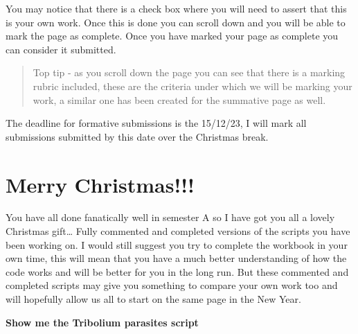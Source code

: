 \documentclass[
]{book}
\begin{document}
You may notice that there is a check box where you will need to assert that this is your own work. Once this is done you can scroll down and you will be able to mark the page as complete. Once you have marked your page as complete you can consider it submitted.

\begin{quote}
Top tip - as you scroll down the page you can see that there is a marking rubric included, these are the criteria under which we will be marking your work, a similar one has been created for the summative page as well.
\end{quote}

The deadline for formative submissions is the 15/12/23, I will mark all submissions submitted by this date over the Christmas break.

\hypertarget{code}{%
\chapter{Merry Christmas!!!}\label{code}}

You have all done fanatically well in semester A so I have got you all a lovely Christmas gift\ldots{} Fully commented and completed versions of the scripts you have been working on. I would still suggest you try to complete the workbook in your own time, this will mean that you have a much better understanding of how the code works and will be better for you in the long run. But these commented and completed scripts may give you something to compare your own work too and will hopefully allow us all to start on the same page in the New Year.

\textbf{Show me the Tribolium parasites script}
\end{document}
